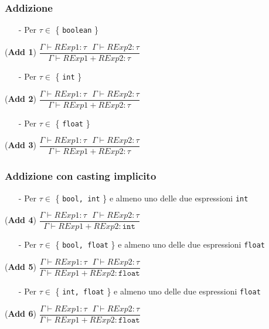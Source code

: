 \documentclass[12pt]{article}
\begin{document}
\subsubsection*{Addizione}

\begin{center}

\begin{itemize}
\item[-] Per $\tau \in$ \{ \texttt{boolean} \}
\end{itemize}
\noindent(\textbf{Add 1})
$\dfrac{\Gamma \vdash RExp1:\tau\ \ \ \Gamma \vdash RExp2:\tau}{\Gamma \vdash RExp1\ \texttt{+}\ RExp2:\tau}$\\[0.1in]

\begin{itemize}
\item[-] Per $\tau \in$ \{ \texttt{int} \}
\end{itemize}
\noindent(\textbf{Add 2})
$\dfrac{\Gamma \vdash RExp1:\tau\ \ \ \Gamma \vdash RExp2:\tau}{\Gamma \vdash RExp1\ \texttt{+}\ RExp2:\tau}$\\[0.1in]

\begin{itemize}
\item[-] Per $\tau \in$ \{ \texttt{float} \}
\end{itemize}
\noindent(\textbf{Add 3})
$\dfrac{\Gamma \vdash RExp1:\tau\ \ \ \Gamma \vdash RExp2:\tau}{\Gamma \vdash RExp1\ \texttt{+}\ RExp2:\tau}$\\[0.1in]
\end{center}
\subsubsection*{Addizione con casting implicito}
\begin{center}
\begin{itemize}
\item[-] Per $\tau \in$ \{ \texttt{bool, int} \} e almeno uno delle due espressioni \texttt{int}
\end{itemize}
\noindent(\textbf{Add 4})
$\dfrac{\Gamma \vdash RExp1:\tau\ \ \ \Gamma \vdash RExp2:\tau}{\Gamma \vdash RExp1\ \texttt{+}\ RExp2:\texttt{int}}$\\[0.1in]
\begin{itemize}
\item[-] Per $\tau \in$ \{ \texttt{bool, float} \} e almeno uno delle due espressioni \texttt{float}
\end{itemize}

\noindent(\textbf{Add 5})
$\dfrac{\Gamma \vdash RExp1:\tau\ \ \ \Gamma \vdash RExp2:\tau}{\Gamma \vdash RExp1\ \texttt{+}\ RExp2:\texttt{float}}$\\[0.1in]
\begin{itemize}
\item[-] Per $\tau \in$ \{ \texttt{int, float} \} e almeno uno delle due espressioni \texttt{float}
\end{itemize}
\noindent(\textbf{Add 6})
$\dfrac{\Gamma \vdash RExp1:\tau\ \ \ \Gamma \vdash RExp2:\tau}{\Gamma \vdash RExp1\ \texttt{+}\ RExp2:\texttt{float}}$\\[0.1in]
\end{center}
\end{document}
